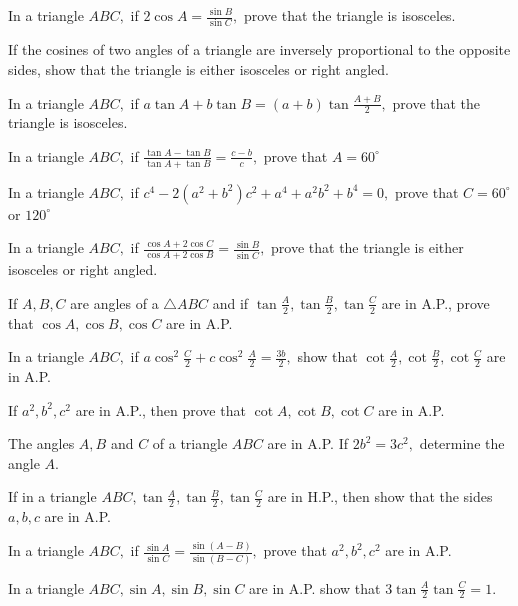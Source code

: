 \item In a triangle $ABC,$ if $2\cos A = \frac{\sin B}{\sin C},$ prove that the triangle is isosceles.

\item If the cosines of two angles of a triangle are inversely proportional to the opposite sides, show that the triangle is either
    isosceles or right angled.

\item In a triangle $ABC,$ if $a\tan A + b\tan B = (a + b)\tan\frac{A + B}{2},$ prove that the triangle is isosceles.

\item In a triangle $ABC,$ if $\frac{\tan A - \tan B}{\tan A + \tan B} = \frac{c - b}{c},$ prove that $A =
    60^\circ$

\item In a triangle $ABC,$ if $c^4 - 2(a^2 + b^2)c^2 + a^4 + a^2b^2 + b^4 = 0,$ prove that $C=60^\circ$ or
    $120^\circ$

\item In a triangle $ABC,$ if $\frac{\cos A + 2\cos C}{\cos A + 2\cos B} = \frac{\sin B}{\sin C},$ prove that the
    triangle is either isosceles or right angled.

\item If $A, B, C$ are angles of a $\triangle ABC$ and if $\tan\frac{A}{2}, \tan\frac{B}{2}, \tan\frac{C}{2}$ are
    in A.P., prove that $\cos A, \cos B, \cos C$ are in A.P.

\item In a triangle $ABC,$ if $a\cos^2\frac{C}{2} + c\cos^2\frac{A}{2} = \frac{3b}{2},$ show that $\cot\frac{A}{2},
    \cot\frac{B}{2}, \cot\frac{C}{2}$ are in A.P.

\item If $a^2, b^2, c^2$ are in A.P., then prove that $\cot A, \cot B, \cot C$ are in A.P.

\item The angles $A, B$ and $C$ of a triangle $ABC$ are in A.P. If $2b^2 = 3c^2,$ determine the angle $A.$

\item If in a triangle $ABC, \tan\frac{A}{2}, \tan\frac{B}{2}, \tan\frac{C}{2}$ are in H.P., then show that the sides $a,
    b, c$ are in A.P.

\item In a triangle $ABC,$ if $\frac{\sin A}{\sin C} = \frac{\sin(A - B)}{\sin(B - C)},$ prove that $a^2, b^2, c^2$
    are in A.P.

\item In a triangle $ABC, \sin A, \sin B, \sin C$ are in A.P. show that $3\tan\frac{A}{2}\tan\frac{C}{2} = 1.$


